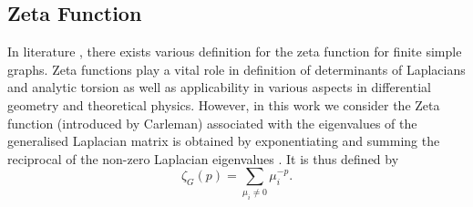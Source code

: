 \documentclass[10pt,a4paper]{article}
\begin{document}
        \subsection{Zeta Function}
        In literature \citep{knill2013zeta,friedli2017spectral}, there exists various definition for the zeta function for finite simple graphs. Zeta functions play a vital role in definition of determinants of Laplacians and analytic torsion \citep{voros1987spectral,  moscovici1991r} as well as applicability in various aspects in differential geometry and theoretical physics. However, in this work we consider the Zeta function (introduced by Carleman) associated with the eigenvalues of the generalised Laplacian matrix is obtained by exponentiating and summing the reciprocal of the non-zero Laplacian eigenvalues \citep{friedli2017spectral}. It is thus defined by
        \begin{equation}
        \zeta_G(p) =  \sum_{\mu_{i} \neq 0} \mu_{i} ^{-p}.
        \end{equation}
             
\end{document}
